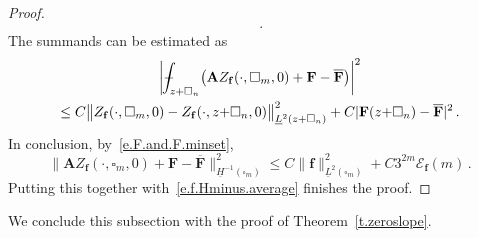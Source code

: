 \documentclass[11pt]{article} %
\let\oldsquare\square %
\renewcommand{\square}{\oldsquare}
\numberwithin{equation}{section}
\theoremstyle{definition}
\newcommand{\f}{\mathbf{f}}
\newcommand{\cu}{\square}
\def\Xint#1{\mathchoice
{\XXint\displaystyle\textstyle{#1}}%
{\XXint\textstyle\scriptstyle{#1}}%
{\XXint\scriptstyle\scriptscriptstyle{#1}}%
{\XXint\scriptscriptstyle\scriptscriptstyle{#1}}%
\!\int}
\def\XXint#1#2#3{{\setbox0=\hbox{$#1{#2#3}{\int}$}
\vcenter{\hbox{$#2#3$}}\kern-.5\wd0}}
\def\fint{\Xint-}
\newcommand{\bfA}{\mathbf{A}}
\newcommand{\bfF}{\mathbf{F}}
\begin{document}
\begin{proof}
\begin{multline*}
\,.
\end{multline*}
The summands can be estimated as 
\begin{multline*}  
\biggl| \fint_{z + \cu_n} \bigl( \bfA  Z_\f(\cdot,\cu_m,0) + \bfF - \overline{\bfF} \bigr) \biggr|^2
\\ \leq
 C\bigl\| Z_\f(\cdot,\cu_m,0) - Z_\f(\cdot,z{+}\cu_n,0) \bigr\|_{\underline{L}^{2}(z{+}\cu_n)}^2  
 +
C | \bfF(z{+}\cu_n) - \overline{\bfF}|^2
\,.
\end{multline*}
In conclusion, by~\eqref{e.F.and.F.minset},
\begin{equation*}  
\bigl\| \bfA Z_\f(\cdot,\cu_m,0) + \bfF - \overline{\bfF} \bigr\|_{\underline{H}^{-1}(\cu_m)}^2 
\leq 
C \| \f \|_{\underline{L}^2(\cu_m)}^2  + C 3^{2m} \mathcal{E}_\f(m)
\,.
\end{equation*}
Putting this together with~\eqref{e.f.Hminus.average} finishes the proof.
\end{proof}

We conclude this subsection with the proof of Theorem~\ref{t.zeroslope}. 
\end{document}
